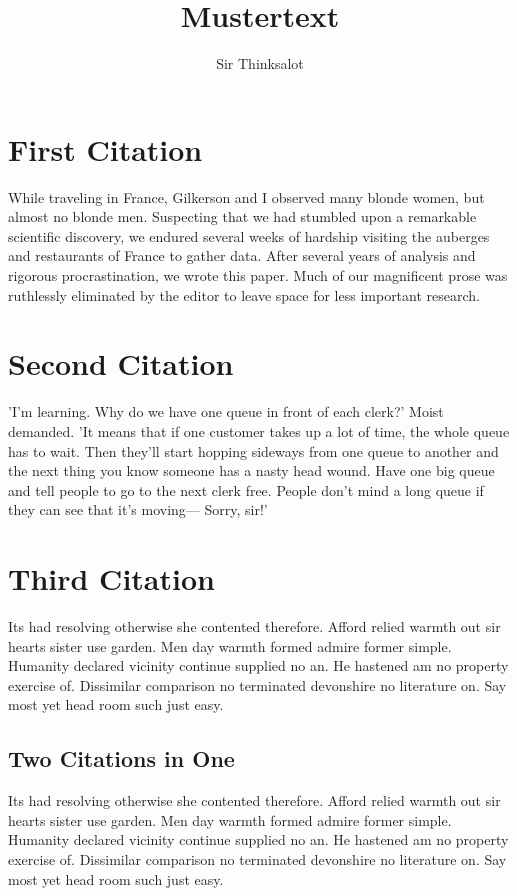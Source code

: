 \documentclass{article}
\title{Mustertext}
\author{Sir Thinksalot}
\begin{document}
\maketitle

\section{First Citation}

While traveling in France, Gilkerson and I observed many blonde women, but almost no blonde men.  Suspecting that we had stumbled upon a remarkable scientific discovery, we endured several weeks of hardship visiting the auberges and restaurants of France to gather data.  After several years of analysis and rigorous procrastination, we wrote this paper.  Much of our magnificent prose was ruthlessly eliminated by the editor to leave space for less important research.  \citep{gilkerson07}

\section{Second Citation}

'I'm learning. Why do we have one queue in front of each clerk?' Moist demanded. 'It means that if one customer takes up a lot of time, the whole queue has to wait. Then they'll start hopping sideways from one queue to another and the next thing you know someone has a nasty head wound. Have one big queue and tell people to go to the next clerk free. People don't mind a long queue if they can see that it's moving— Sorry, sir!'  \citep{moist01}

\section{Third Citation}

Its had resolving otherwise she contented therefore. Afford relied warmth out sir hearts sister use garden. Men day warmth formed admire former simple. Humanity declared vicinity continue supplied no an. He hastened am no property exercise of. Dissimilar comparison no terminated devonshire no literature on. Say most yet head room such just easy.  \citep{random99}

\subsection{Two Citations in One}

Its had resolving otherwise she contented therefore. Afford relied warmth out sir hearts sister use garden. Men day warmth formed admire former simple. Humanity declared vicinity continue supplied no an. He hastened am no property exercise of. Dissimilar comparison no terminated devonshire no literature on. Say most yet head room such just easy. \citep{gilkerson07,random99}
\newpage





\end{document}

